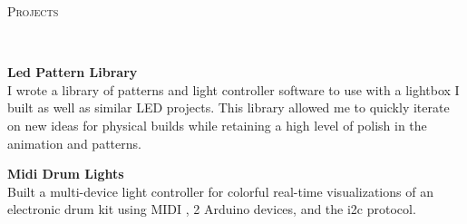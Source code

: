 \documentclass{article}
\newenvironment{changemargin}[2]{%
  \begin{list}{}{%
    \setlength{\topsep}{0pt}%
    \setlength{\leftmargin}{#1}%
    \setlength{\rightmargin}{#2}%
    \setlength{\listparindent}{\parindent}%
    \setlength{\itemindent}{\parindent}%
    \setlength{\parsep}{\parskip}%
  }%
  \item[]}{\end{list}
}
\newcommand{\lineover}{
	\begin{changemargin}{-0.05in}{-0.05in}
		\vspace*{-8pt}
		\hrulefill \\
		\vspace*{-2pt}
	\end{changemargin}
}
\newcommand{\header}[1]{
	\begin{changemargin}{-0.5in}{-0.5in}
		\scshape{#1}\\
  	\lineover
	\end{changemargin}
}
\newenvironment{body} {
	\vspace*{-16pt}
	\begin{changemargin}{-0.25in}{-0.5in}
  }	
	{\end{changemargin}
}
\begin{document}
\smallskip


\header{Projects}
\begin{body}
	\vspace{20pt}
	
	\vspace{8pt}
	\textbf{Led Pattern Library}\\
	I wrote a library of patterns and light controller software to use with a lightbox I built as well as similar LED projects. This library allowed me to quickly iterate on new ideas for physical builds while retaining a high level of polish in the animation and patterns.

	\vspace{8pt}
	\textbf{Midi Drum Lights}\\
	Built a multi-device light controller for colorful real-time visualizations of an electronic drum kit using MIDI , 2 Arduino devices, and the i2c protocol.
		
\end{body}
\end{document}
